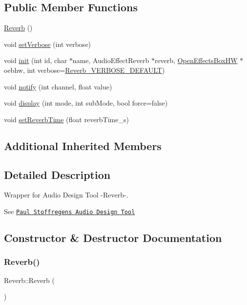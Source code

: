 \subsection*{Public Member Functions}
\begin{DoxyCompactItemize}
\item 
\mbox{\hyperlink{class_reverb_a765b925557df7e43bf5ed275fc6950d1}{Reverb}} ()
\item 
void \mbox{\hyperlink{class_reverb_a9b0d44b54237d7eec20b6e6de4befa6a}{set\+Verbose}} (int verbose)
\item 
void \mbox{\hyperlink{class_reverb_ae82272ebf02fe46091a72eb04132a1c6}{init}} (int id, char $\ast$name, Audio\+Effect\+Reverb $\ast$reverb, \mbox{\hyperlink{class_open_effects_box_h_w}{Open\+Effects\+Box\+HW}} $\ast$oebhw, int verbose=\mbox{\hyperlink{_reverb_8h_a4d31e478011f0f65e621d80f142d6f8f}{Reverb\+\_\+\+V\+E\+R\+B\+O\+S\+E\+\_\+\+D\+E\+F\+A\+U\+LT}})
\item 
void \mbox{\hyperlink{class_reverb_a0a4818faef8203311b3c31eb9d59c277}{notify}} (int channel, float value)
\item 
void \mbox{\hyperlink{class_reverb_aaf90c9b334f7e1c869c5b406ada68135}{display}} (int mode, int sub\+Mode, bool force=false)
\item 
void \mbox{\hyperlink{class_reverb_a6bc52d8dde1853a63a8e01e7d20a678e}{set\+Reverb\+Time}} (float reverb\+Time\+\_\+s)
\end{DoxyCompactItemize}
\subsection*{Additional Inherited Members}


\subsection{Detailed Description}
Wrapper for Audio Design Tool -\/\+Reverb-\/. 

See \href{https://www.pjrc.com/teensy/gui/}{\tt Paul Stoffregen\textquotesingle{}s Audio Design Tool} 

\subsection{Constructor \& Destructor Documentation}
\mbox{\label{class_reverb_a765b925557df7e43bf5ed275fc6950d1}} 
\subsubsection{\texorpdfstring{Reverb()}{Reverb()}}
{\footnotesize\ttfamily Reverb\+::\+Reverb (\begin{DoxyParamCaption}{ }\end{DoxyParamCaption})}




